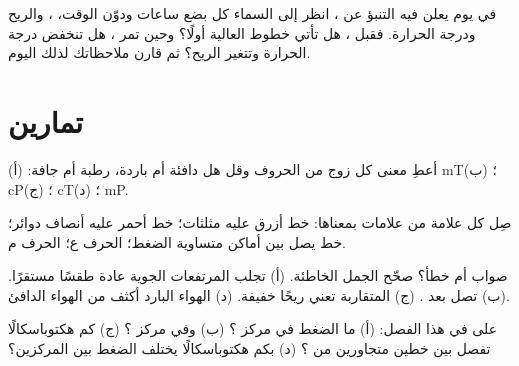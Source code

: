 \begin{inthefield}
في يوم يعلن فيه التنبؤ عن ، انظر إلى السماء كل بضع ساعات ودوّن الوقت،
، والريح ودرجة الحرارة. فقبل ، هل تأتي خطوط 
العالية أولًا؟ وحين تمر ، هل تنخفض درجة الحرارة وتتغير الريح؟ ثم
قارن ملاحظاتك   لذلك اليوم.
\end{inthefield}

\section{تمارين}

\begin{exercise}[$\star$]\label{exo:g8:fronts-and-weather-maps:1}
أعطِ معنى كل زوج من الحروف وقل هل  دافئة أم باردة، رطبة أم
جافة: (أ) mT؛ (ب) cP؛ (ج) cT؛ (د) mP.
\end{exercise}

\begin{exercise}[$\star$]\label{exo:g8:fronts-and-weather-maps:2}
صِل كل علامة من علامات   بمعناها: خط أزرق عليه مثلثات؛ خط أحمر
عليه أنصاف دوائر؛ خط يصل بين أماكن متساوية الضغط؛ الحرف ع؛ الحرف
م.
\end{exercise}

\begin{exercise}[$\star$]\label{exo:g8:fronts-and-weather-maps:3}
صواب أم خطأ؟ صحّح الجمل الخاطئة. (أ) تجلب المرتفعات الجوية عادة طقسًا
مستقرًا. (ب) تصل   بعد . (ج) 
المتقاربة تعني ريحًا خفيفة. (د) الهواء البارد أكثف من الهواء
الدافئ.
\end{exercise}

\begin{exercise}[$\star$]\label{exo:g8:fronts-and-weather-maps:4}
على   في هذا الفصل: (أ) ما الضغط في مركز ؟ (ب) وفي
مركز ؟ (ج) كم هكتوباسكالًا تفصل بين خطين متجاورين من ؟ (د) بكم هكتوباسكالًا يختلف الضغط بين
المركزين؟
\end{exercise}

